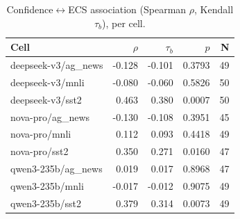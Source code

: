 \begin{table}[t]
\centering
\caption{Confidence$\leftrightarrow$ECS association (Spearman $\rho$, Kendall $\tau_b$), per cell.}
\label{tab:confidence}
\begin{tabular}{lrrrr}
\toprule
Cell & $\rho$ & $\tau_b$ & $p$ & N \\
\midrule
deepseek-v3/ag_news & -0.128 & -0.101 & 0.3793 & 49 \\
deepseek-v3/mnli & -0.080 & -0.060 & 0.5826 & 50 \\
deepseek-v3/sst2 & 0.463 & 0.380 & 0.0007 & 50 \\
nova-pro/ag_news & -0.130 & -0.108 & 0.3951 & 45 \\
nova-pro/mnli & 0.112 & 0.093 & 0.4418 & 49 \\
nova-pro/sst2 & 0.350 & 0.271 & 0.0160 & 47 \\
qwen3-235b/ag_news & 0.019 & 0.017 & 0.8968 & 47 \\
qwen3-235b/mnli & -0.017 & -0.012 & 0.9075 & 49 \\
qwen3-235b/sst2 & 0.379 & 0.314 & 0.0073 & 49 \\
\bottomrule
\end{tabular}
\end{table}
